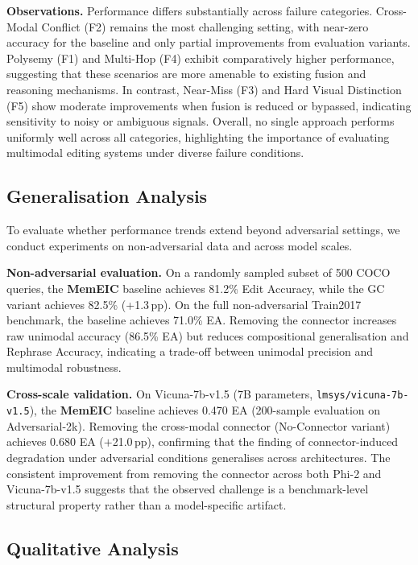 \documentclass{article}
\newcommand{\memeic}{\textbf{MemEIC}}
\begin{document}
\textbf{Observations.}
Performance differs substantially across failure categories. Cross-Modal Conflict (F2) remains the most challenging setting, with near-zero accuracy for the baseline and only partial improvements from evaluation variants. Polysemy (F1) and Multi-Hop (F4) exhibit comparatively higher performance, suggesting that these scenarios are more amenable to existing fusion and reasoning mechanisms. In contrast, Near-Miss (F3) and Hard Visual Distinction (F5) show moderate improvements when fusion is reduced or bypassed, indicating sensitivity to noisy or ambiguous signals. Overall, no single approach performs uniformly well across all categories, highlighting the importance of evaluating multimodal editing systems under diverse failure conditions.




\subsection{Generalisation Analysis}
\label{sec:generalisation}

To evaluate whether performance trends extend beyond adversarial settings, we conduct experiments on non-adversarial data and across model scales.

\textbf{Non-adversarial evaluation.}
\label{sec:non_adv}
On a randomly sampled subset of 500 COCO queries, the \memeic{} baseline achieves 81.2\% Edit Accuracy, while the GC variant achieves 82.5\% (+1.3\,pp). On the full non-adversarial Train2017 benchmark, the baseline achieves 71.0\% EA. Removing the connector increases raw unimodal accuracy (86.5\% EA) but reduces compositional generalisation and Rephrase Accuracy, indicating a trade-off between unimodal precision and multimodal robustness.

\textbf{Cross-scale validation.}
\label{sec:scale}
On Vicuna-7b-v1.5 (7B parameters, \texttt{lmsys/vicuna-7b-v1.5}), the \memeic{} baseline achieves 0.470 EA (200-sample evaluation on Adversarial-2k). Removing the cross-modal connector (No-Connector variant) achieves 0.680 EA ($+$21.0\,pp), confirming that the finding of connector-induced degradation under adversarial conditions generalises across architectures. The consistent improvement from removing the connector across both Phi-2 and Vicuna-7b-v1.5 suggests that the observed challenge is a benchmark-level structural property rather than a model-specific artifact.

\subsection{Qualitative Analysis}
\label{sec:qualitative}
\end{document}
